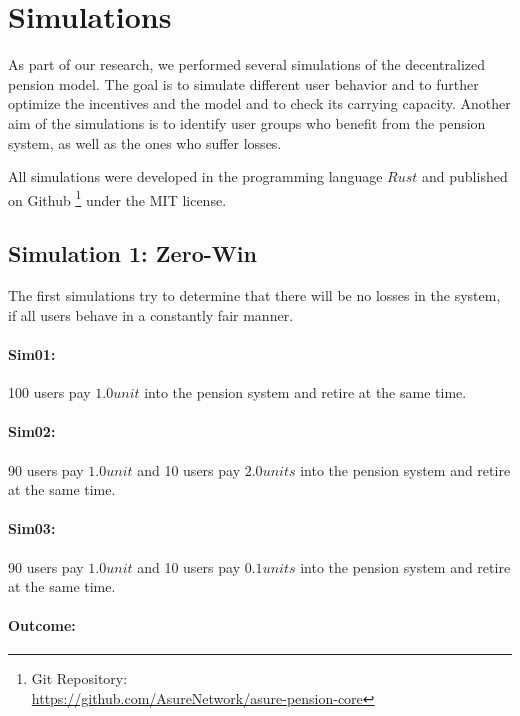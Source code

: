 \section{Simulations}

As part of our research, we performed several simulations of the decentralized pension model. The goal is to simulate different user behavior and to further optimize the incentives and the model and to check its carrying capacity. Another aim of the simulations is to identify user groups who benefit from the pension system, as well as the ones who suffer losses.

All simulations were developed in the programming language $Rust$ and published on Github \footnote{ Git Repository:\\
\url{https://github.com/AsureNetwork/asure-pension-core}} under the MIT license.\\


\subsection{Simulation 1: Zero-Win}

The first simulations try to determine that there will be no losses in the system, if all users behave in a constantly fair manner.

\paragraph{Sim01:} 100 users pay $1.0 unit$ into the pension system and retire at the same time.

\paragraph{Sim02:} 90 users pay $1.0 unit$ and 10 users pay $2.0 units$ into the pension system and retire at the same time.

\paragraph{Sim03:} 90 users pay $1.0 unit$ and 10 users pay $0.1 units$ into the pension system and retire at the same time.

\paragraph{Outcome:}

\begin{table}[hbt!]
\centering
{}
\end{table}

